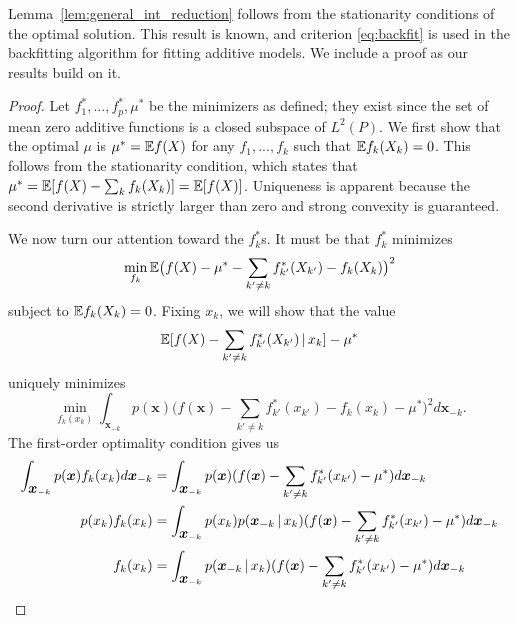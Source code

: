 Lemma~\ref{lem:general_int_reduction} follows from the stationarity
conditions of the optimal solution.   This result is known, and
criterion \eqref{eq:backfit} is used in the backfitting
algorithm for fitting additive models.   We include 
a proof as our results build on it.

\begin{proof}
  Let $f^*_1,...,f^*_p, \mu^*$ be the minimizers as defined; they exist since the set of mean zero additive functions is a closed subspace of $L^2(P)$.  We first
  show that the optimal $\mu$ is $\mu^* = {\mathbb E} f(X)$ for any $f_1, ...,
  f_k$ such that ${\mathbb E} f_k(X_k) = 0$. This follows from the stationarity
  condition, which states that $\mu^* = {\mathbb E}[ f(X) - \sum_k f_k(X_k)] =
  {\mathbb E}[ f(X) ]$. Uniqueness is apparent because the second derivative is
  strictly larger than zero and strong convexity is guaranteed.

  We now turn our attention toward the $f^*_k$s.  It must be that
  $f^*_k$ minimizes 
\begin{equation}
\min_{f_k} {\mathbb E}  \big( f(X) - \mu^* - \sum_{k' \neq k}
  f^*_{k'} (X_{k'}) - f_k (X_k) \big)^2 
\end{equation}
subject to ${\mathbb E} f_k(X_k) = 0$.
Fixing $x_k$, we will show that the value 
\begin{equation}
{\mathbb E}[ f(X) - \sum_{k' \neq k}
f_{k'}^*(X_{k'}) {\,|\,} x_k] - \mu^*
\end{equation} 
uniquely minimizes
\begin{equation}
\min_{ f_k(x_k) } \int_{\mathbf{x}_{-k}} p(\mathbf{x}) 
         \Big( f(\mathbf{x}) - \sum_{k' \neq k} f^*_{k'} (x_{k'}) - f_k (x_k) -\mu^*\Big)^2 
                 d \mathbf{x}_{-k}.
\end{equation}
The first-order optimality condition gives us
\begin{align}
\int_{\mbox{\boldmath $x$}_{-k}} p(\mbox{\boldmath $x$}) f_k(x_k) d \mbox{\boldmath $x$}_{-k} &= 
  \int_{\mbox{\boldmath $x$}_{-k}} p(\mbox{\boldmath $x$}) 
      ( f(\mbox{\boldmath $x$})-\sum_{k' \neq k} f^*_{k'}(x_{k'})-\mu^*) d \mbox{\boldmath $x$}_{-k} \\  
p(x_k) f_k(x_k) &= \int_{\mbox{\boldmath $x$}_{-k}} p(x_k)
     p(\mbox{\boldmath $x$}_{-k} {\,|\,} x_k ) 
     ( f(\mbox{\boldmath $x$}) - \sum_{k' \neq k} f^*_{k'} (x_{k'})-\mu^*) 
              d \mbox{\boldmath $x$}_{-k} \\
f_k(x_k) &= \int_{\mbox{\boldmath $x$}_{-k}} 
       p(\mbox{\boldmath $x$}_{-k} {\,|\,} x_k ) 
     (f(\mbox{\boldmath $x$}) - \sum_{k'\neq k} f^*_{k'} (x_{k'})  -\mu^*) d \mbox{\boldmath $x$}_{-k} 
 \end{align}



\end{proof}

